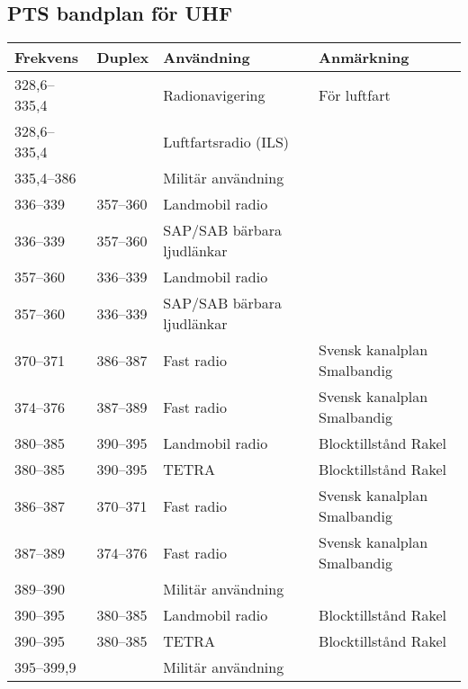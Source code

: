 \documentclass[10pt,swedish,a4paper,twoside]{article}
\begin{document}
\begin{landscape}
\section{PTS bandplan för UHF}
\begin{longtable}{llll}
	\textbf{Frekvens}  & \textbf{Duplex} & \textbf{Användning}         & \textbf{Anmärkning}             \\ \hline
	328,6--335,4       &                 & Radionavigering             & För luftfart                    \\
	328,6--335,4       &                 & Luftfartsradio (ILS)        &  \\
	335,4--386         &                 & Militär användning          &  \\
	336--339           & 357--360        & Landmobil radio             &  \\
	336--339           & 357--360        & SAP/SAB bärbara ljudlänkar  &  \\
	357--360           & 336--339        & Landmobil radio             &  \\
	357--360           & 336--339        & SAP/SAB bärbara ljudlänkar  &  \\
	370--371           & 386--387        & Fast radio                  & Svensk kanalplan Smalbandig     \\
	374--376           & 387--389        & Fast radio                  & Svensk kanalplan Smalbandig     \\
	380--385           & 390--395        & Landmobil radio             & Blocktillstånd Rakel            \\
	380--385           & 390--395        & TETRA                       & Blocktillstånd Rakel            \\
	386--387           & 370--371        & Fast radio                  & Svensk kanalplan Smalbandig     \\
	387--389           & 374--376        & Fast radio                  & Svensk kanalplan Smalbandig     \\
	389--390           &                 & Militär användning          &  \\
	390--395           & 380--385        & Landmobil radio             & Blocktillstånd Rakel            \\
	390--395           & 380--385        & TETRA                       & Blocktillstånd Rakel            \\
	395--399,9         &                 & Militär användning          &  \\

\end{longtable}
\end{landscape}
\end{document}
